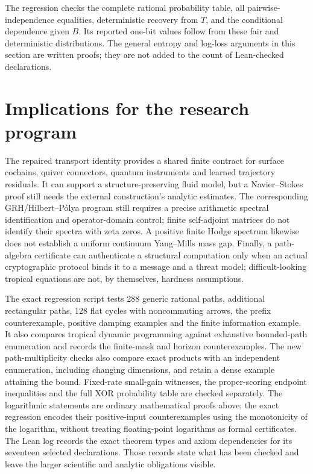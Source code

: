 The regression checks the complete rational probability table, all
pairwise-independence equalities, deterministic recovery from $T$, and
the conditional dependence given $B$. Its reported one-bit values follow
from these fair and deterministic distributions. The general entropy and
log-loss arguments in this section are written proofs; they are not added
to the count of Lean-checked declarations.

\section{Implications for the research program}

The repaired transport identity provides a shared finite contract for
surface cochains, quiver connectors, quantum instruments and learned
trajectory residuals. It can support a structure-preserving fluid model,
but a Navier--Stokes proof still needs the external construction's analytic
estimates. The corresponding GRH/Hilbert--P\'olya program still requires a
precise arithmetic spectral identification and operator-domain control;
finite self-adjoint matrices do not identify their spectra with zeta zeros.
A positive finite Hodge spectrum likewise does not establish a uniform
continuum Yang--Mills mass gap. Finally, a path-algebra certificate can
authenticate a structural computation only when an actual cryptographic
protocol binds it to a message and a threat model; difficult-looking
tropical equations are not, by themselves, hardness assumptions.

The exact regression script tests 288 generic rational paths, additional
rectangular paths, 128 flat cycles with noncommuting arrows, the prefix
counterexample, positive damping examples and the finite information
example. It also compares tropical dynamic programming against exhaustive
bounded-path enumeration and records the finite-mask and horizon
counterexamples. The new path-multiplicity checks also compare exact
products with an independent enumeration, including changing dimensions,
and retain a dense example attaining the bound. Fixed-rate small-gain
witnesses, the proper-scoring endpoint inequalities and the full XOR
probability table are checked separately. The logarithmic statements are ordinary mathematical
proofs above; the exact regression encodes their positive-input
counterexamples using the monotonicity of the logarithm, without treating
floating-point logarithms as formal certificates. The Lean log records
the exact theorem types and axiom dependencies for its seventeen selected
declarations. Those records state what has been checked and leave the
larger scientific and analytic obligations visible.
